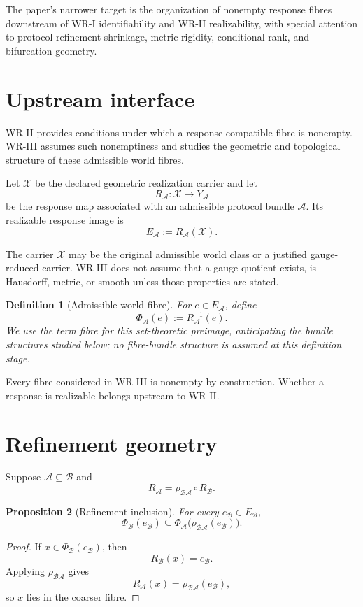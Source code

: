 \documentclass[11pt]{article}
\newtheorem{definition}{Definition}[section]
\newtheorem{proposition}[definition]{Proposition}
\newcommand{\X}{\mathcal X}
\newcommand{\Acal}{\mathcal A}
\newcommand{\Bcal}{\mathcal B}
\begin{document}
The paper's narrower target is the organization of nonempty response fibres
downstream of WR-I identifiability and WR-II realizability, with special
attention to protocol-refinement shrinkage, metric rigidity, conditional rank,
and bifurcation geometry.
\section{Upstream interface}

WR-II provides conditions under which a response-compatible fibre is nonempty. WR-III assumes such nonemptiness and studies the geometric and topological structure of these admissible world fibres.

Let \(\X\) be the declared geometric
realization carrier and let
\[
R_{\Acal}:\X\to Y_{\Acal}
\]
be the response map associated with an admissible protocol bundle \(\Acal\).
Its realizable response image is
\[
E_{\Acal}:=R_{\Acal}(\X).
\]

The carrier \(\X\) may be the original admissible world class or a justified
gauge-reduced carrier. WR-III does not assume that a gauge quotient exists, is
Hausdorff, metric, or smooth unless those properties are stated.

\begin{definition}[Admissible world fibre]
For \(e\in E_{\Acal}\), define
\[
\Phi_{\Acal}(e):=R_{\Acal}^{-1}(e).
\]
We use the term \emph{fibre} for this set-theoretic preimage, anticipating the bundle structures studied below; no fibre-bundle structure is assumed at this definition stage.
\end{definition}

Every fibre considered in WR-III is nonempty by construction. Whether a
response is realizable belongs upstream to WR-II.

\section{Refinement geometry}

Suppose \(\Acal\subseteq\Bcal\) and
\[
R_{\Acal}
=
\rho_{\Bcal\Acal}\circ R_{\Bcal}.
\]

\begin{proposition}[Refinement inclusion]
For every \(e_{\Bcal}\in E_{\Bcal}\),
\[
\Phi_{\Bcal}(e_{\Bcal})
\subseteq
\Phi_{\Acal}\bigl(\rho_{\Bcal\Acal}(e_{\Bcal})\bigr).
\]
\end{proposition}

\begin{proof}
If \(x\in\Phi_{\Bcal}(e_{\Bcal})\), then
\[
R_{\Bcal}(x)=e_{\Bcal}.
\]
Applying \(\rho_{\Bcal\Acal}\) gives
\[
R_{\Acal}(x)=\rho_{\Bcal\Acal}(e_{\Bcal}),
\]
so \(x\) lies in the coarser fibre.
\end{proof}
\end{document}
